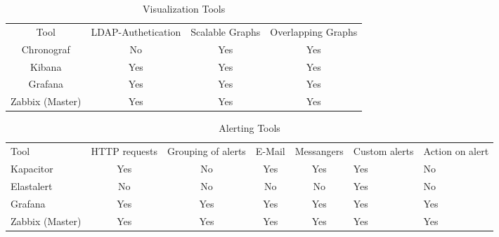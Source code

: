 \begin{table}[]
\centering
\caption{Visualization Tools}
\label{my-label}
\begin{tabular}{cccc}
Tool & LDAP-Authetication         & Scalable Graphs             & Overlapping Graphs          \\
Chronograf                   & No & Yes                         & Yes                         \\
Kibana                       & Yes                        & Yes & Yes                         \\
Grafana                      & Yes                        & Yes & Yes                         \\
Zabbix (Master)              & Yes                        & Yes                         & Yes
\end{tabular}
\end{table}

\begin{table}[]
	\centering
	\caption{Alerting Tools}
	\label{my-label}
	\begin{tabular}{lcccc}
		Tool & HTTP requests & Grouping of alerts         & E-Mail                      & Messangers                  & Custom alerts & Action on alert \\
		Kapacitor                    & Yes           & No & Yes                         & Yes                         & Yes           & No              \\
		Elastalert                   & No            & No                         & No  & No                          & Yes           & No              \\
		Grafana                      & Yes           & Yes                        & Yes & Yes                         & Yes           & Yes             \\
		Zabbix (Master)              & Yes           & Yes                        & Yes                         & Yes & Yes           & Yes            
	\end{tabular}
\end{table}

